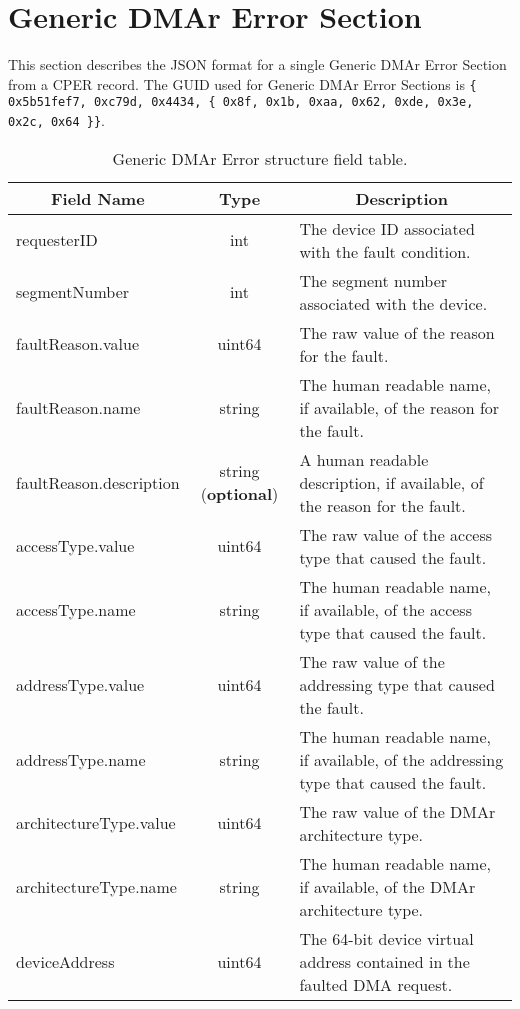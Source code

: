 \documentclass{report}
\newcommand*{\thead}[1]{\multicolumn{1}{|c|}{\bfseries #1}}
\newcommand*{\jsontable}[1]{
    \begin{table}[!ht]
    \label{#1}
    \centering
    \begin{adjustbox}{center}
    \begin{tabular}{|l|c|p{8cm}|}
    \hline
    \thead{Field Name} & \thead{Type} & \thead{Description} \\
    \hline
}
\newcommand*{\jsontableend}[1]{
    \hline
    \end{tabular}
    \end{adjustbox}
    \caption{#1}
    \label{table:#1}
    \end{table}
    \FloatBarrier
}
\begin{document}
\section{Generic DMAr Error Section}
\label{section:dmargenericerrorsection}
This section describes the JSON format for a single Generic DMAr Error Section from a CPER record. The GUID used for Generic DMAr Error Sections is \texttt{\{ 0x5b51fef7, 0xc79d, 0x4434, \{ 0x8f, 0x1b, 0xaa, 0x62, 0xde, 0x3e, 0x2c, 0x64 \}\}}.
\jsontable{table:dmargenericerrorsection}
requesterID & int & The device ID associated with the fault condition.\\
\hline
segmentNumber & int & The segment number associated with the device.\\
\hline
faultReason.value & uint64 & The raw value of the reason for the fault.\\
faultReason.name & string & The human readable name, if available, of the reason for the fault.\\
faultReason.description & string (\textbf{optional}) & A human readable description, if available, of the reason for the fault.\\
\hline
accessType.value & uint64 & The raw value of the access type that caused the fault.\\
accessType.name & string & The human readable name, if available, of the access type that caused the fault.\\
\hline
addressType.value & uint64 & The raw value of the addressing type that caused the fault.\\
addressType.name & string & The human readable name, if available, of the addressing type that caused the fault.\\
\hline
architectureType.value & uint64 & The raw value of the DMAr architecture type.\\
architectureType.name & string & The human readable name, if available, of the DMAr architecture type.\\
\hline
deviceAddress & uint64 & The 64-bit device virtual address contained in the faulted DMA request.\\
\jsontableend{Generic DMAr Error structure field table.}

\end{document}
